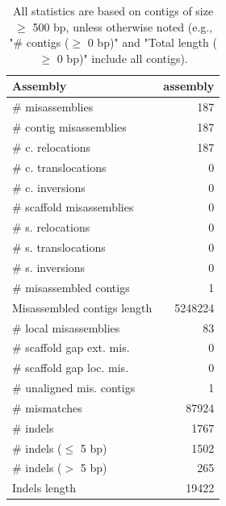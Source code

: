 \documentclass[12pt,a4paper]{article}
\begin{document}
\begin{table}[ht]
\begin{center}
\caption{All statistics are based on contigs of size $\geq$ 500 bp, unless otherwise noted (e.g., "\# contigs ($\geq$ 0 bp)" and "Total length ($\geq$ 0 bp)" include all contigs).}
\begin{tabular}{|l*{1}{|r}|}
\hline
Assembly & assembly \\ \hline
\# misassemblies & 187 \\ \hline
\hspace{2mm}\# contig misassemblies & 187 \\ \hline
\hspace{5mm}\# c. relocations & 187 \\ \hline
\hspace{5mm}\# c. translocations & 0 \\ \hline
\hspace{5mm}\# c. inversions & 0 \\ \hline
\hspace{2mm}\# scaffold misassemblies & 0 \\ \hline
\hspace{5mm}\# s. relocations & 0 \\ \hline
\hspace{5mm}\# s. translocations & 0 \\ \hline
\hspace{5mm}\# s. inversions & 0 \\ \hline
\# misassembled contigs & 1 \\ \hline
Misassembled contigs length & 5248224 \\ \hline
\# local misassemblies & 83 \\ \hline
\# scaffold gap ext. mis. & 0 \\ \hline
\# scaffold gap loc. mis. & 0 \\ \hline
\# unaligned mis. contigs & 1 \\ \hline
\# mismatches & 87924 \\ \hline
\# indels & 1767 \\ \hline
\hspace{5mm}\# indels ($\leq$ 5 bp) & 1502 \\ \hline
\hspace{5mm}\# indels ($>$ 5 bp) & 265 \\ \hline
Indels length & 19422 \\ \hline
\end{tabular}
\end{center}
\end{table}
\end{document}
